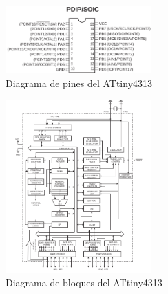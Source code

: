 \begin{figure}[H]
    \centering
    \includegraphics[width=0.5\textwidth]{images/pines.png}
    \caption{Diagrama de pines del ATtiny4313 \cite{datasheet}}
    \label{pines}
\end{figure}

\begin{figure}[H]
    \centering
    \includegraphics[width=0.5\textwidth]{images/bloques.png}
    \caption{Diagrama de bloques del ATtiny4313 \cite{datasheet}}
    \label{bloques}
\end{figure}